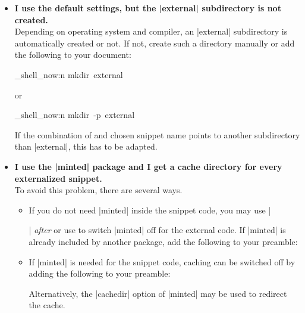 \begin{itemize}

\item\textbf{I use the default settings, but the |external| subdirectory is
  not created.}\\
  Depending on operating system and compiler, an |external| subdirectory is
  automatically created or not. If not, create such a directory manually
  or add the following to your document:
\begin{dispListing}
\ExplSyntaxOn
\sys_shell_now:n { mkdir~external }
\ExplSyntaxOff
\end{dispListing}
or
\begin{dispListing}
\ExplSyntaxOn
\sys_shell_now:n { mkdir~-p~external }
\ExplSyntaxOff
\end{dispListing}
  If the combination of  and chosen snippet
  name points to another subdirectory than |external|, this has to be
  adapted.

\item\textbf{I use the |minted| package and I get a cache directory for
  every externalized snippet.}\\
  To avoid this problem, there are several ways.
  \begin{itemize}
  \item If you do not need |minted| inside the snippet code, you may use
    |\usepackage{minted}| \emph{after} 
    or use  to switch |minted| off for the external code.
    If |minted| is already included by another package, add the following to
    your preamble:
\begin{dispListing}
\end{dispListing}
  \item If |minted| is needed for the snippet code, caching can be switched
    off by adding the following to your preamble:
\begin{dispListing}
\end{dispListing}
  Alternatively, the |cachedir| option of |minted| may be used to redirect
  the cache.
  \end{itemize}


\end{itemize}

